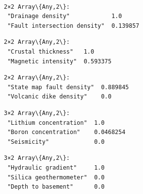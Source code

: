 \documentclass[11pt]{article}
\begin{document}
    \begin{Verbatim}[commandchars=\\\{\}]

    \end{Verbatim}

    \begin{center}
    \end{center}
    { \hspace*{\fill} \\}
    
    \begin{Verbatim}[commandchars=\\\{\}]

    \end{Verbatim}

    
    \begin{Verbatim}[commandchars=\\\{\}]
2×2 Array\{Any,2\}:
 "Drainage density"            1.0
 "Fault intersection density"  0.139857
    \end{Verbatim}

    
    
    \begin{Verbatim}[commandchars=\\\{\}]
2×2 Array\{Any,2\}:
 "Crustal thickness"   1.0
 "Magnetic intensity"  0.593375
    \end{Verbatim}

    
    
    \begin{Verbatim}[commandchars=\\\{\}]
2×2 Array\{Any,2\}:
 "State map fault density"  0.889845
 "Volcanic dike density"    0.0
    \end{Verbatim}

    
    
    \begin{Verbatim}[commandchars=\\\{\}]
3×2 Array\{Any,2\}:
 "Lithium concentration"  1.0
 "Boron concentration"    0.0468254
 "Seismicity"             0.0
    \end{Verbatim}

    
    
    \begin{Verbatim}[commandchars=\\\{\}]
3×2 Array\{Any,2\}:
 "Hydraulic gradient"     1.0
 "Silica geothermometer"  0.0
 "Depth to basement"      0.0
    \end{Verbatim}
\end{document}
